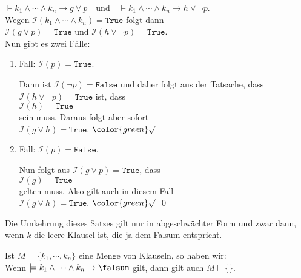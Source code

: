 \begin{enumerate}
      $\models k_1 \wedge \cdots \wedge k_n \rightarrow g \vee p \quad \mathrm{und} \quad 
         \models k_1 \wedge \cdots \wedge k_n \rightarrow h \vee \neg p
      $.
      \\[0.2cm]
      Wegen $\mathcal{I}(k_1 \wedge \cdots \wedge k_n) = \texttt{True}$ folgt dann
      \\[0.2cm]
      \hspace*{1.3cm}
      $\mathcal{I}(g \vee p) = \texttt{True}$ \quad und \quad $\mathcal{I}(h \vee \neg p) = \texttt{True}$.
      \\[0.2cm]
      Nun gibt es zwei Fälle:
      \begin{enumerate}
      \item Fall: $\mathcal{I}(p) = \texttt{True}$.

            Dann ist $\mathcal{I}(\neg p) = \texttt{False}$ und daher folgt aus der Tatsache, dass 
            $\mathcal{I}(h \vee \neg p) = \texttt{True}$ ist, dass
            \\[0.2cm]
            \hspace*{1.3cm}
            $\mathcal{I}(h) = \texttt{True}$
            \\[0.2cm]
            sein muss.  Daraus folgt aber sofort
            \\[0.2cm]
            \hspace*{1.3cm}
            $\mathcal{I}(g \vee h) = \texttt{True}$.  ${\color{green}\surd}$
      \item Fall: $\mathcal{I}(p) = \texttt{False}$.

            Nun folgt aus $\mathcal{I}(g \vee p) = \texttt{True}$, dass
            \\[0.2cm]
            \hspace*{1.3cm}
            $\mathcal{I}(g) = \texttt{True}$
            \\[0.2cm]
            gelten muss.  Also gilt auch in diesem Fall
            \\[0.2cm]
            \hspace*{1.3cm}
            $\mathcal{I}(g \vee h) = \texttt{True}$.  ${\color{green}\surd}$ 
            \qed
      \end{enumerate}
\end{enumerate}

\noindent
Die Umkehrung dieses Satzes gilt nur in abgeschwächter Form und zwar dann, wenn $k$
die leere Klausel ist, die ja dem Falsum entspricht.

\begin{Satz} \label{widerlegungs-vollstaendig}
  Ist  $M = \{k_1, \cdots, k_n \}$ eine Menge von Klauseln,
  so haben wir: \\[0.1cm]
  \hspace*{1.3cm} 
  Wenn $\models k_1 \wedge \cdots \wedge k_n \rightarrow \falsum$ gilt, dann gilt auch  $M \vdash \{\}$.
\end{Satz}

